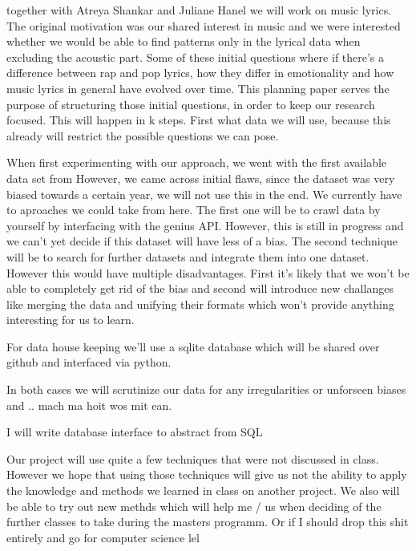 \documentclass{article}
\begin{document}

together with Atreya Shankar and Juliane Hanel we will work on music lyrics. The original motivation was our shared interest in music and we were interested whether we would be able to find patterns only in the lyrical data when excluding the acoustic part. Some of these initial questions where if there's a difference between rap and pop lyrics, how they differ in emotionality and how music lyrics in general have evolved over time. 
This planning paper serves the purpose of structuring those initial questions, in order to keep our research focused. This will happen in k%
 steps. First what data we will use, because this already will restrict the possible questions we can pose. 



When first experimenting with our approach, we went with the first available data set from %
However, we came across initial flaws, since the dataset was very biased towards a certain year, we will not use this in the end. We currently have to aproaches we could take from here. The first one will be to crawl data by yourself by interfacing with the genius API.%
However, this is still in progress and we can't yet decide if this dataset will have less of a bias. The second technique will be to search for further datasets and integrate them into one dataset. However this would have multiple disadvantages. First it's likely that we won't be able to completely get rid of the bias and second will introduce new challanges like merging the data and unifying their formats which won't provide anything interesting for us to learn. 

For data house keeping we'll use a sqlite database which will be shared over github and interfaced via python. 

In both cases we will scrutinize %
our data for any irregularities or unforseen biases and .. mach ma hoit wos mit ean.



I will write database interface to abstract from SQL

Our project will use quite a few techniques that were not discussed in class. However we hope that using those techniques will give us not the ability to apply the knowledge and methods we learned in class on another project. We also will be able to try out new methds which will help me / us when deciding of the further classes to take during the masters programm. Or if I should drop this shit entirely and go for computer science lel
\end{document}
